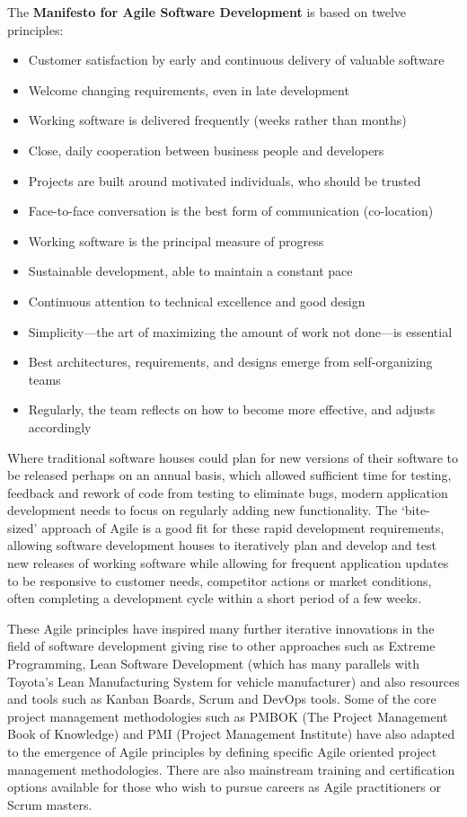 \documentclass[a4paper,Times New Roman 11pt]{article}
\begin{document}
\begin{samepage}
\begin{samepage}
The \textbf{Manifesto for Agile Software Development} is based on twelve principles:
\begin{itemize}
\item Customer satisfaction by early and continuous delivery of valuable software
\item Welcome changing requirements, even in late development
\item Working software is delivered frequently (weeks rather than months)
\item Close, daily cooperation between business people and developers
\item Projects are built around motivated individuals, who should be trusted
\item Face-to-face conversation is the best form of communication (co-location)
\item Working software is the principal measure of progress
\item Sustainable development, able to maintain a constant pace
\item Continuous attention to technical excellence and good design
\item Simplicity—the art of maximizing the amount of work not done—is essential
\item Best architectures, requirements, and designs emerge from self-organizing teams
\item Regularly, the team reflects on how to become more effective, and adjusts accordingly
\end{itemize}

Where traditional software houses could plan for new versions of their software to be released perhaps on an annual basis, which allowed sufficient time for testing, feedback and rework of code from testing to eliminate bugs, modern application development needs to focus on regularly adding new functionality. The `bite-sized' approach of Agile is a good fit for these rapid development requirements, allowing software development houses to iteratively plan and develop and test new releases of working software while allowing for frequent application updates to be responsive to customer needs, competitor actions or market conditions, often completing a development cycle within a short period of a few weeks.

These Agile principles have inspired many further iterative innovations in the field of software development giving rise to other approaches such as Extreme Programming, Lean Software Development (which has many parallels with Toyota's Lean Manufacturing System for vehicle manufacturer) and also resources and tools such as Kanban Boards, Scrum and DevOps tools. Some of the core project management methodologies such as PMBOK (The Project Management Book of Knowledge) and PMI (Project Management Institute) have also adapted to the emergence of Agile principles by defining specific Agile oriented project management methodologies. There are also mainstream training and certification options available for those who wish to pursue careers as Agile practitioners or Scrum masters.


\end{samepage}
\end{samepage}
\end{document}
